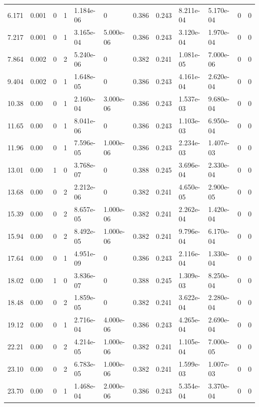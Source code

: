 \documentclass[preview]{standalone}
\begin{document}
{{\begin{tabular}{L{1.2cm}C{1.2cm} C{0.3cm}C{0.5cm} C{1.4cm}C{1.4cm} C{1.4cm}C{1.4cm} C{1.6cm}C{1.6cm} C{1.6cm}C{1.6cm}}
  6.171  &  0.001  & 0     &  1 &  1.184e-06  & 0  &  0.386&   0.243& 8.211e-04 & 5.170e-04   &  0 & 0  \\ 
  7.217  &  0.001  & 0     &  1 &  3.165e-04  & 5.000e-06  &  0.386&   0.243& 3.120e-04 & 1.970e-04   &  0 & 0  \\ 
  7.864  &  0.002  & 0     &  2 &  5.240e-06  & 0  &  0.382&   0.241& 1.081e-05 & 7.000e-06   &  0 & 0  \\ 
  9.404  &  0.002  & 0     &  1 &  1.648e-05  & 0  &  0.386&   0.243& 4.161e-04 & 2.620e-04   &  0 & 0  \\ 
  10.38  &  0.00  & 0     &  1 &  2.160e-04  & 3.000e-06  &  0.386&   0.243& 1.537e-03 & 9.680e-04   &  0 & 0  \\ 
  11.65  &  0.00  & 0     &  1 &  8.041e-06  & 0  &  0.386&   0.243& 1.103e-03 & 6.950e-04   &  0 & 0  \\ 
  11.96  &  0.00  & 0     &  1 &  7.596e-05  & 1.000e-06  &  0.386&   0.243& 2.234e-03 & 1.407e-03   &  0 & 0  \\ 
  13.01  &  0.00  & 1     &  0 &  3.768e-07  & 0  &  0.388&   0.245& 3.696e-04 & 2.330e-04   &  0 & 0  \\ 
  13.68  &  0.00  & 0     &  2 &  2.212e-06  & 0  &  0.382&   0.241& 4.650e-05 & 2.900e-05   &  0 & 0  \\ 
  15.39  &  0.00  & 0     &  2 &  8.657e-05  & 1.000e-06  &  0.382&   0.241& 2.262e-04 & 1.420e-04   &  0 & 0  \\ 
  15.94  &  0.00  & 0     &  2 &  8.492e-05  & 1.000e-06  &  0.382&   0.241& 9.796e-04 & 6.170e-04   &  0 & 0  \\ 
  17.64  &  0.00  & 0     &  1 &  4.951e-09  & 0  &  0.386&   0.243& 2.116e-04 & 1.330e-04   &  0 & 0  \\ 
  18.02  &  0.00  & 1     &  0 &  3.836e-07  & 0  &  0.388&   0.245& 1.309e-03 & 8.250e-04   &  0 & 0  \\ 
  18.48  &  0.00  & 0     &  2 &  1.859e-05  & 0  &  0.382&   0.241& 3.622e-04 & 2.280e-04   &  0 & 0  \\ 
  19.12  &  0.00  & 0     &  1 &  2.716e-04  & 4.000e-06  &  0.386&   0.243& 4.265e-04 & 2.690e-04   &  0 & 0  \\ 
  22.21  &  0.00  & 0     &  2 &  4.214e-05  & 1.000e-06  &  0.382&   0.241& 1.105e-04 & 7.000e-05   &  0 & 0  \\ 
  23.10  &  0.00  & 0     &  2 &  6.783e-05  & 1.000e-06  &  0.382&   0.241& 1.599e-03 & 1.007e-03   &  0 & 0  \\ 
  23.70  &  0.00  & 0     &  1 &  1.468e-04  & 2.000e-06  &  0.386&   0.243& 5.354e-04 & 3.370e-04   &  0 & 0  \\ 

\end{tabular}}}
\end{document}
